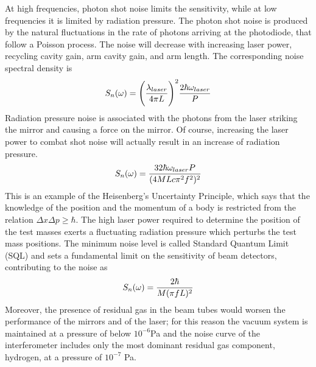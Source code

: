 \documentclass[binding=0.6cm, LaM]{sapthesis}
\begin{document}
        At high frequencies, photon shot noise limits the sensitivity, 
	while at low frequencies it is limited by radiation pressure.
        The photon shot noise is produced by the natural fluctuations in the rate of photons arriving at the photodiode,
        that follow a Poisson process. The noise will decrease with increasing laser power,
        recycling cavity gain, arm cavity gain, and arm length.
        The corresponding noise spectral density is
        \begin{equation}
          S_n(\omega) = \Bigg({{\lambda_{laser}} \over {4 \pi L}}\Bigg)^2 {{2 \hbar \omega_{laser}} \over {P}}
        \end{equation}
        Radiation pressure noise is associated with the photons from the laser striking the mirror
        and causing a force on the mirror. Of course, increasing the laser power to combat shot noise
        will actually result in an increase of radiation pressure.
        \begin{equation}
          S_n(\omega) =  {{32 \hbar \omega_{laser}P} \over {(4MLc \pi^2 f^2)^2}}
        \end{equation}
        This is an example of the Heisenberg’s Uncertainty Principle, which says that the knowledge
        of the position and the momentum of a body is restricted from the relation $\Delta x \Delta p \geq \hbar$. 
        The high laser power required to determine the position of the test masses exerts
        a fluctuating radiation pressure which perturbs the test mass positions. 
        The minimum noise level is called Standard Quantum Limit (SQL) and sets a fundamental limit
        on the sensitivity of beam detectors, contributing to the noise as
        \begin{equation}
          S_n(\omega) = {{2 \hbar} \over {M(\pi f L)^2}}
        \end{equation}
        Moreover, the presence of residual gas in the beam tubes would worsen the performance
        of the mirrors and of the laser; for this reason the vacuum system is maintained at a pressure
        of below $10^{-6}$Pa and the noise curve of the interferometer includes only
        the most dominant residual gas component, hydrogen, at a pressure of $10^{−7}$ Pa. 
\end{document}
